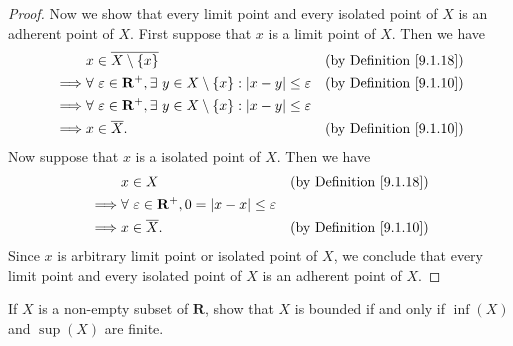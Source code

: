 \begin{proof}
    Now we show that every limit point and every isolated point of \(X\) is an adherent point of \(X\).
    First suppose that \(x\) is a limit point of \(X\).
    Then we have
    \begin{align*}
                 & x \in \overline{X \setminus \{x\}}                                                                      & \text{(by Definition \ref{9.1.18})} \\
        \implies & \forall\ \varepsilon \in \mathbf{R}^+, \exists\ y \in X \setminus \{x\} : \abs*{x - y} \leq \varepsilon & \text{(by Definition \ref{9.1.10})} \\
        \implies & \forall\ \varepsilon \in \mathbf{R}^+, \exists\ y \in X \setminus \{x\} : \abs*{x - y} \leq \varepsilon                                       \\
        \implies & x \in \overline{X}.                                                                                     & \text{(by Definition \ref{9.1.10})}
    \end{align*}
    Now suppose that \(x\) is a isolated point of \(X\).
    Then we have
    \begin{align*}
                 & x \in X                                                                  & \text{(by Definition \ref{9.1.18})} \\
        \implies & \forall\ \varepsilon \in \mathbf{R}^+, 0 = \abs*{x - x} \leq \varepsilon                                       \\
        \implies & x \in \overline{X}.                                                      & \text{(by Definition \ref{9.1.10})}
    \end{align*}
    Since \(x\) is arbitrary limit point or isolated point of \(X\), we conclude that every limit point and every isolated point of \(X\) is an adherent point of \(X\).
\end{proof}

\begin{exercise}\label{ex 9.1.10}
    If \(X\) is a non-empty subset of \(\mathbf{R}\), show that \(X\) is bounded if and only if \(\inf(X)\) and \(\sup(X)\) are finite.
\end{exercise}

